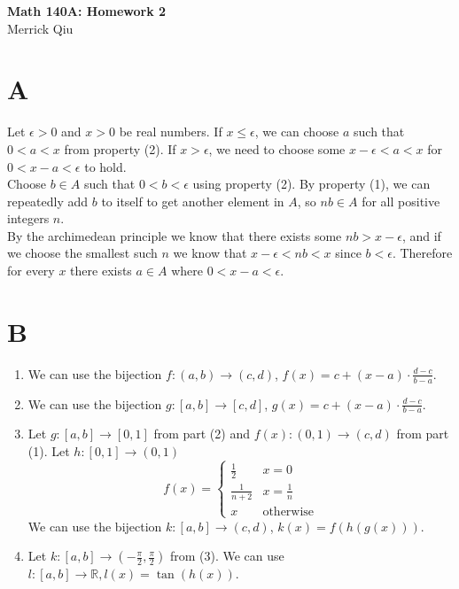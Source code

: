 \documentclass{article}
\begin{document}
\begin{center}
	\huge{\bf Math 140A: Homework 2} \\
	Merrick Qiu
\end{center}

\section*{A}
Let $\epsilon > 0$ and $x > 0$ be real numbers.
If $ x \leq \epsilon$, we can choose $a$ such that $ 0 < a < x$ from property (2).
If $x > \epsilon$, we need to choose some $x- \epsilon < a < x$ for $0 < x-a < \epsilon$ to hold.\\

Choose $b \in A$ such that $0 < b < \epsilon$ using property (2).
By property (1), we can repeatedly add $b$ to itself to get another element in $A$,
so $nb \in A$ for all positive integers $n$.\\

By the archimedean principle we know that there exists some $nb > x - \epsilon$,
and if we choose the smallest such $n$ we know that $x- \epsilon < nb < x$
since $b < \epsilon$. Therefore for every $x$ there exists $a \in A$ where $0 < x-a < \epsilon$.


\section*{B}
\begin{enumerate}
    \item We can use the bijection 
    $f: (a, b) \rightarrow (c, d)$, $f(x) = c + (x-a)\cdot \frac{d-c}{b-a}$.
    \item We can use the bijection 
    $g: [a, b] \rightarrow [c, d]$, $g(x) = c + (x-a)\cdot \frac{d-c}{b-a}$.
    \item Let $g: [a, b] \rightarrow [0, 1]$ from part (2) and 
    $f(x): (0, 1) \rightarrow (c, d)$ from part (1).
    Let $h: [0,1] \rightarrow (0,1)$
    \[
        f(x) = \begin{cases}
            \frac{1}{2}  & x = 0 \\
            \frac{1}{n+2} & x = \frac{1}{n} \\
            x & \text{otherwise}
        \end{cases}
    \]
    We can use the bijection $k: [a,b] \rightarrow (c,d)$, $k(x) = f(h(g(x)))$.
    \item Let $k: [a,b] \rightarrow (-\frac{\pi}{2},\frac{\pi}{2})$ from (3).
    We can use $l: [a,b] \rightarrow \mathbb{R}, l(x) = \tan(h(x))$.
\end{enumerate}
\end{document}
